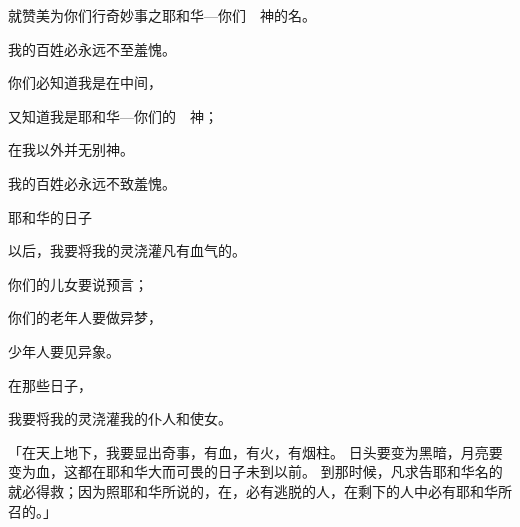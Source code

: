 {\par }{\Q 就赞美为你们行奇妙事之耶和华—你们　神的名。
\par }{\Q 我的百姓必永远不至羞愧。
\par }{\Q {}你们必知道我是在{}中间，
\par }{\Q 又知道我是耶和华—你们的　神；
\par }{\Q 在我以外并无别神。
\par }{\Q 我的百姓必永远不致羞愧。
\par }{\SH 耶和华的日子
\par }{\Q {}以后，我要将我的灵浇灌凡有血气的。
\par }{\Q 你们的儿女要说预言；
\par }{\Q 你们的老年人要做异梦，
\par }{\Q 少年人要见异象。
\par }{\Q {}在那些日子，
\par }{\Q 我要将我的灵浇灌我的仆人和使女。
\par }{\PP {}「在天上地下，我要显出奇事，有血，有火，有烟柱。
日头要变为黑暗，月亮要变为血，这都在耶和华大而可畏的日子未到以前。
到那时候，凡求告耶和华名的就必得救；因为照耶和华所说的，在{}，{}必有逃脱的人，在剩下的人中必有耶和华所召的。」

}

